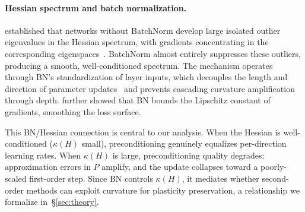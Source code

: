 \documentclass{article}
\begin{document}
\begin{table}[t]
\caption{Second-order optimizers studied in this work.}
\label{tab:optimizers}
\centering
{}
\end{table}

\paragraph{Hessian spectrum and batch normalization.}
\citet{ghorbani2019investigation} established that networks without BatchNorm develop large isolated outlier eigenvalues in the Hessian spectrum, with gradients concentrating in the corresponding eigenspaces~\citep{gurari2018gradient}. BatchNorm almost entirely suppresses these outliers, producing a smooth, well-conditioned spectrum. The mechanism operates through BN's standardization of layer inputs, which decouples the length and direction of parameter updates~\citep{kohler2019batchnorm} and prevents cascading curvature amplification through depth. \citet{santurkar2018does} further showed that BN bounds the Lipschitz constant of gradients, smoothing the loss surface.

This BN/Hessian connection is central to our analysis. When the Hessian is well-conditioned ($\kappa(H)$ small), preconditioning genuinely equalizes per-direction learning rates. When $\kappa(H)$ is large, preconditioning quality degrades: approximation errors in $P$ amplify, and the update collapses toward a poorly-scaled first-order step. Since BN controls $\kappa(H)$, it mediates whether second-order methods can exploit curvature for plasticity preservation, a relationship we formalize in~\S\ref{sec:theory}.
\end{document}
